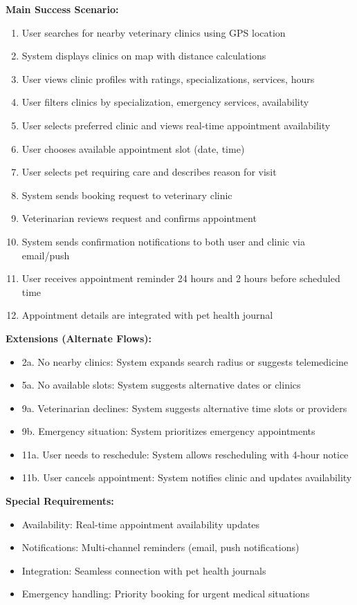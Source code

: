 \textbf{Main Success Scenario:}
\begin{enumerate}
    \item User searches for nearby veterinary clinics using GPS location
    \item System displays clinics on map with distance calculations
    \item User views clinic profiles with ratings, specializations, services, hours
    \item User filters clinics by specialization, emergency services, availability
    \item User selects preferred clinic and views real-time appointment availability
    \item User chooses available appointment slot (date, time)
    \item User selects pet requiring care and describes reason for visit
    \item System sends booking request to veterinary clinic
    \item Veterinarian reviews request and confirms appointment
    \item System sends confirmation notifications to both user and clinic via email/push
    \item User receives appointment reminder 24 hours and 2 hours before scheduled time
    \item Appointment details are integrated with pet health journal
\end{enumerate}

\textbf{Extensions (Alternate Flows):}
\begin{itemize}
    \item 2a. No nearby clinics: System expands search radius or suggests telemedicine
    \item 5a. No available slots: System suggests alternative dates or clinics
    \item 9a. Veterinarian declines: System suggests alternative time slots or providers
    \item 9b. Emergency situation: System prioritizes emergency appointments
    \item 11a. User needs to reschedule: System allows rescheduling with 4-hour notice
    \item 11b. User cancels appointment: System notifies clinic and updates availability
\end{itemize}

\textbf{Special Requirements:}
\begin{itemize}
    \item Availability: Real-time appointment availability updates
    \item Notifications: Multi-channel reminders (email, push notifications)
    \item Integration: Seamless connection with pet health journals
    \item Emergency handling: Priority booking for urgent medical situations
\end{itemize}

